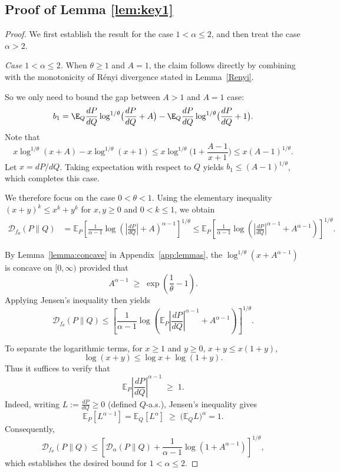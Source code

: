 \documentclass[11pt]{article}
\providecommand{\DD}{\mathcal{D}}
\renewcommand{\paragraph}[1]{\noindent\textit{#1}}
\providecommand{\Renyi}{R\'enyi }
\begin{document}
\subsection{Proof of Lemma \ref{lem:key1}}
\begin{proof} 
We first establish the result for the case $1<\alpha\le 2$, and then treat the case $\alpha>2$.

\paragraph{Case $1<\alpha\le 2$.}
When $\theta\ge 1$ and $A=1$, the claim follows directly by combining
\cite[Proposition~1]{chu2023unified} with the monotonicity of \Renyi divergence stated in Lemma~\ref{Renyi}.

So we only need to bound the gap between $A>1$ and $A=1$ case:
\[
b_1=\E_Q \frac{dP}{dQ} \log^{1/\theta} \bigl(\frac{d P}{d Q} +A \bigr )-\E_Q \frac{dP}{dQ} \log^{1/\theta} \bigl(\frac{d P}{d Q} +1 \bigr ).
\]
Note that
\[
x\log^{1/\theta}(x+A)-x\log^{1/\theta}(x+1)\leq x \log^{1/\theta}\bigl ( 1+\frac{A-1}{x+1}\bigr ) \leq x (A-1)^{1/\theta}.
\]
Let $x=dP/dQ$. Taking expectation with respect to $Q$ yields $b_1\leq (A-1)^{1/\theta}$, which completes this case.

We therefore focus on the case $0<\theta<1$. Using the elementary inequality
$(x+y)^k \le x^k+y^k$ for $x,y\ge 0$ and $0<k\le 1$, we obtain
\[
\begin{aligned}
\DD_{f_\theta}(P\|Q)
&= \mathbb{E}_P\!\left[
\frac{1}{\alpha-1}
\log\!\left(\left|\frac{dP}{dQ}\right|+A\right)^{\alpha-1}
\right]^{1/\theta} \le
\mathbb{E}_P\!\left[
\frac{1}{\alpha-1}
\log\!\left(
\left|\frac{dP}{dQ}\right|^{\alpha-1}
+ A^{\alpha-1}
\right)
\right]^{1/\theta}.
\end{aligned}
\]

By Lemma~\ref{lemma:concave} in Appendix~\ref{app:lemmas}, the $\log^{1/\theta}(x+A^{\alpha-1})$ is concave on $[0,\infty)$ provided that
\[
A^{\alpha-1} \;\ge\; \exp\!\left(\frac{1}{\theta}-1\right).
\]
Applying Jensen's inequality then yields
\[
\DD_{f_\theta}(P\|Q)
\le
\left[
\frac{1}{\alpha-1}
\log\!\left(
\mathbb{E}_P\!\left|\frac{dP}{dQ}\right|^{\alpha-1}
+ A^{\alpha-1}
\right)
\right]^{1/\theta}.
\]

To separate the logarithmic terms, for $x\ge 1$ and $y\ge 0$,
$x+y \le x(1+y)$, 
\[
\log(x+y) \le \log x + \log(1+y).
\]
Thus it suffices to verify that
\[
\mathbb{E}_P\!\left|\frac{dP}{dQ}\right|^{\alpha-1} \;\ge\; 1.
\]
Indeed, writing $L:=\frac{dP}{dQ}\ge 0$ (defined $Q$-a.s.), Jensen's inequality gives
\[
\mathbb{E}_P[L^{\alpha-1}]
=\mathbb{E}_Q[L^\alpha]
\;\ge\;
\bigl(\mathbb{E}_Q L\bigr)^\alpha
=1.
\]
Consequently,
\[
\DD_{f_\theta}(P\|Q)
\le
\left[
\DD_\alpha(P\|Q)
+
\frac{1}{\alpha-1}\log(1+A^{\alpha-1})
\right]^{1/\theta},
\]
which establishes the desired bound for $1<\alpha\le 2$.


\end{proof}
\end{document}
